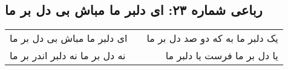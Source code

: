 \begin{center}
\section*{رباعی شماره ۲۳: ای دلبر ما مباش بی دل بر ما}
\label{sec:sh023}
\begin{longtable}{l p{0.5cm} r}
ای دلبر ما مباش بی دل بر ما
&&
یک دلبر ما به که دو صد دل بر ما
\\
نه دل بر ما نه دلبر اندر بر ما
&&
یا دل بر ما فرست یا دلبر ما
\\
\end{longtable}
\end{center}

